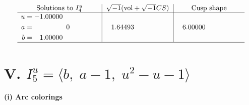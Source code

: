 \documentclass[1p]{elsarticle_modified}
\theoremstyle{definition}
\newcommand{\I}{\sqrt{-1}}
\begin{document}
$$\begin{array}{c|c|c}  
\text{Solutions to }I^u_{4}& \I (\text{vol} + \sqrt{-1}CS) & \text{Cusp shape}\\
 \hline 
\begin{aligned}
u &= -1.00000\phantom{ +0.000000I} \\
a &= \phantom{-0.000000 } 0 \\
b &= \phantom{-}1.00000\phantom{ +0.000000I}\end{aligned}
 & \phantom{-}1.64493\phantom{ +0.000000I} & \phantom{-}6.00000\phantom{ +0.000000I}\\
 \hline 
 \end{array}$$\newpage\newpage\renewcommand{\arraystretch}{1}
\centering \section*{V. $I^u_{5}= \langle b,\;a-1,\;u^2- u-1 \rangle$}
\flushleft \textbf{(i) Arc colorings}\\
\end{document}
